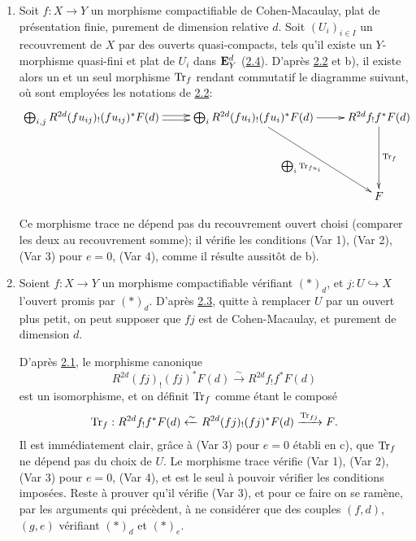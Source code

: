 \documentclass[10pt]{../fichiers-configuration-latex/smfart}
\begin{document}
\begin{enumerate}
On désignera par $\Tr_{f}$ le morphisme $t(f,u)$ construit plus
haut. D'après , ce morphisme trace vérifie (Var 1), (Var 2),
(Var 3) pour $e=0$, et (Var 4). Quand il est défini, il coïncide
nécessairement avec le morphisme trace cherché, si ce dernier existe.

\item Soit $f:X\rightarrow Y$ un morphisme compactifiable de
Cohen-Macaulay, plat de présentation finie, purement de dimension
relative $d$. Soit $(U_{i})_{i\in I}$ un recouvrement de $X$ par des
ouverts quasi-compacts, tels qu'il existe un $Y$-morphisme quasi-fini
et plat de $U_{i}$ dans $\mathbf{E}^{d}_{Y}$ (\hyperref[XVIII.lem2.4]{2.4}). D'après
\hyperref[XVIII.lem2.2]{2.2} et b), il 
existe alors un et un seul morphisme $\Tr_{f}$ rendant commutatif le
diagramme suivant, où sont employées les notations de \hyperref[XVIII.lem2.2]{2.2}:
$$
\xymatrix{
\bigoplus_{i,j}
R^{2d}(fu_{ij})_!(fu_{ij})^{\ast} F(d) \ar@<2pt>[r]
\ar@<-2pt>[r]&\bigoplus_{i}
R^{2d}(fu_i)_!(fu_i)^{\ast}F(d)
\ar[rdd]_{\bigoplus_{i}\Tr_{fu_i}}\ar[r]
& 
R^{2d}f_!f^{\ast}F(d) \ar[dd]^{\Tr_f}\\
& & \\
& & F
}
$$

Ce morphisme trace ne dépend pas du recouvrement ouvert choisi
(comparer les deux au recouvrement somme); il vérifie les conditions
(Var 1), (Var 2), (Var 3) pour $e=0$, (Var 4), comme il résulte
aussitôt de b).

\item Soient $f:X\rightarrow Y$ un morphisme compactifiable vérifiant
$(\ast)_{d}$, et $j:U\hookrightarrow X$\pageoriginale l'ouvert promis
par $(\ast)_{d}$. D'après \hyperref[XVIII.lem2.3]{2.3}, quitte à remplacer $U$
par un ouvert plus petit, on peut supposer que $fj$ est de Cohen-Macaulay, et
purement de dimension $d$.

\noindent
D'après \hyperref[XVIII.lem2.1]{2.1}, le morphisme canonique
$$
R^{2d}(fj)_{!}(fj)^{\ast}F(d)\xrightarrow{\sim}
R^{2d}f_{!}f^{\ast}F(d)
$$
est un isomorphisme, et on définit $\Tr_{f}$ comme étant le composé
$$
\operatorname{Tr}_{f}:R^{2d}f_{!}f^{\ast}F(d)\xleftarrow{\sim}
R^{2d}(fj)_{!}(fj)^{\ast}F(d)\xrightarrow{\operatorname{Tr}_{fj}}F{}.
$$
Il est immédiatement clair, grâce à (Var 3) pour $e=0$ établi en c), que
$\Tr_{f}$ ne dépend pas du choix de $U$. Le morphisme trace vérifie
(Var 1), (Var 2), (Var 3) pour $e=0$, (Var 4), et est le seul à
pouvoir vérifier les conditions imposées. Reste à prouver qu'il
vérifie (Var 3), et pour ce faire on se ramène, par les arguments qui
précèdent, à ne considérer que des couples $(f,d)$, $(g,e)$ vérifiant
$(\ast)_{d}$ et $(\ast)_{e}$.


\end{enumerate}
\end{document}
